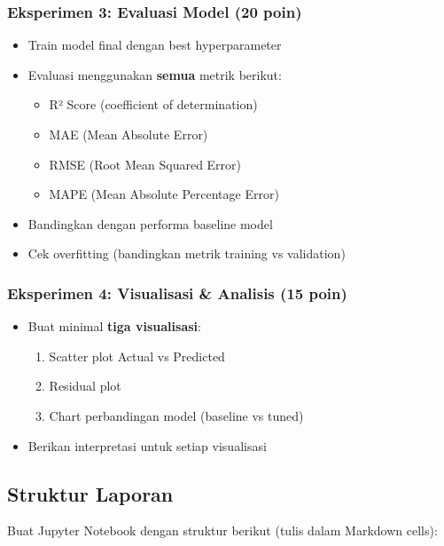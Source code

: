 \documentclass[12pt,a4paper]{article}
\begin{document}
\subsubsection{Eksperimen 3: Evaluasi Model (20 poin)}
\begin{itemize}
    \item Train model final dengan best hyperparameter
    \item Evaluasi menggunakan \textbf{semua} metrik berikut:
    \begin{itemize}
        \item R² Score (coefficient of determination)
        \item MAE (Mean Absolute Error)
        \item RMSE (Root Mean Squared Error)
        \item MAPE (Mean Absolute Percentage Error)
    \end{itemize}
    \item Bandingkan dengan performa baseline model
    \item Cek overfitting (bandingkan metrik training vs validation)
\end{itemize}

\subsubsection{Eksperimen 4: Visualisasi \& Analisis (15 poin)}
\begin{itemize}
    \item Buat minimal \textbf{tiga visualisasi}:
    \begin{enumerate}
        \item Scatter plot Actual vs Predicted
        \item Residual plot
        \item Chart perbandingan model (baseline vs tuned)
    \end{enumerate}
    \item Berikan interpretasi untuk setiap visualisasi
\end{itemize}

\subsection{Struktur Laporan}

Buat Jupyter Notebook dengan struktur berikut (tulis dalam Markdown cells):
\end{document}
